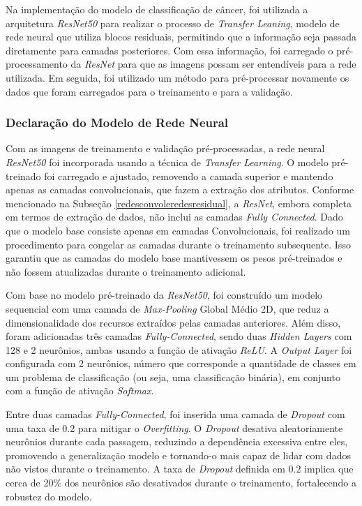 Na implementação do modelo de classificação de câncer, foi utilizada a arquitetura \textit{ResNet50} para realizar o processo de \textit{Transfer Leaning}, modelo de rede neural que utiliza blocos residuais, permitindo que a informação seja passada diretamente para camadas posteriores. Com essa informação, foi carregado o pré-processamento da \textit{ResNet} para que as imagens possam ser entendíveis para a rede utilizada. Em seguida, foi utilizado um método para pré-processar novamente os dados que foram carregados para o treinamento e para a validação.



\subsubsection{\esp Declaração do Modelo de Rede Neural} \label{camadas}

Com as imagens de treinamento e validação pré-processadas, a rede neural \textit{ResNet50} foi incorporada usando a técnica de \textit{Transfer Learning}. O modelo pré-treinado foi carregado e ajustado, removendo a camada superior e mantendo apenas as camadas convolucionais, que fazem a extração dos atributos. Conforme mencionado na Subseção \ref{redesconvoleredesresidual}, a \textit{ResNet}, embora completa em termos de extração de dados, não inclui as camadas \textit{Fully Connected}. Dado que o modelo base consiste apenas em camadas Convolucionais, foi realizado um procedimento para congelar as camadas durante o treinamento subsequente. Isso garantiu que as camadas do modelo base mantivessem os pesos pré-treinados e não fossem atualizadas durante o treinamento adicional. 

Com base no modelo pré-treinado da \textit{ResNet50}, foi construído um modelo sequencial com uma camada de \textit{Max-Pooling} Global Médio 2D, que reduz a dimensionalidade dos recursos extraídos pelas camadas anteriores. Além disso, foram adicionadas três camadas \textit{Fully-Connected}, sendo duas \textit{Hidden Layers} com 128 e 2 neurônios, ambas usando a função de ativação \textit{ReLU}. A \textit{Output Layer} foi configurada com 2 neurônios, número que corresponde a quantidade de classes em um problema de classificação (ou seja, uma classificação binária), em conjunto com a função de ativação \textit{Softmax}.

Entre duas camadas \textit{Fully-Connected}, foi inserida uma camada de \textit{Dropout} com uma taxa de 0.2 para mitigar o \textit{Overfitting}. O \textit{Dropout} desativa aleatoriamente neurônios durante cada passagem, reduzindo a dependência excessiva entre eles, promovendo a generalização modelo e tornando-o mais capaz de lidar com dados não vistos durante o treinamento. A taxa de \textit{Dropout} definida em 0.2 implica que cerca de 20\% dos neurônios são desativados durante o treinamento, fortalecendo a robustez do modelo.


